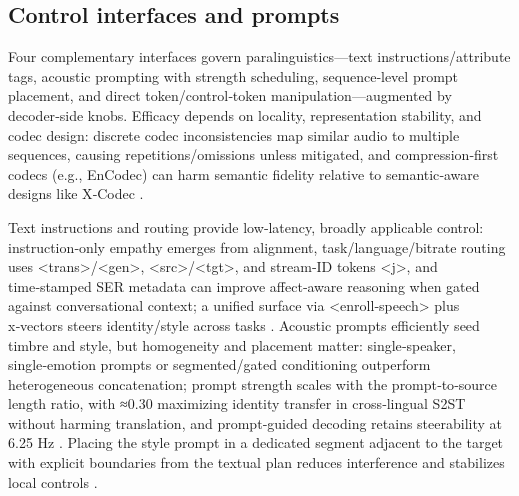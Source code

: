 \documentclass{article}
\begin{document}
\subsection{Control interfaces and prompts} \label{subsec:Control interfaces and prompts}
Four complementary interfaces govern paralinguistics—text instructions/attribute tags, acoustic prompting with strength scheduling, sequence‑level prompt placement, and direct token/control‑token manipulation—augmented by decoder‑side knobs. Efficacy depends on locality, representation stability, and codec design: discrete codec inconsistencies map similar audio to multiple sequences, causing repetitions/omissions unless mitigated, and compression‑first codecs (e.g., EnCodec) can harm semantic fidelity relative to semantic‑aware designs like X‑Codec \cite{liu2024analyzingmitigatinginconsistencydiscrete,ye2024codecdoesmatterexploringsemanticshortcom,fily2024establishingdegreesclosenessbetweenaudio}.

Text instructions and routing provide low‑latency, broadly applicable control: instruction‑only empathy emerges from alignment, task/language/bitrate routing uses <trans>/<gen>, <src>/<tgt>, and stream‑ID tokens <j>, and time‑stamped SER metadata can improve affect‑aware reasoning when gated against conversational context; a unified surface via <enroll‑speech> plus x‑vectors steers identity/style across tasks \cite{wang2024blspemotowardsempatheticlargespeechlangu,peng2024mslms2stmultitaskspeechlanguagemodeltext,wang2025incorporatingcontextualparalinguisticund,wu2024speechcomposerunifyingmultiplespeechtask}. Acoustic prompts efficiently seed timbre and style, but homogeneity and placement matter: single‑speaker, single‑emotion prompts or segmented/gated conditioning outperform heterogeneous concatenation; prompt strength scales with the prompt‑to‑source length ratio, with ≈0.30 maximizing identity transfer in cross‑lingual S2ST without harming translation, and prompt‑guided decoding retains steerability at 6.25 Hz \cite{peng2024empiricalstudyspeechlanguagemodelsprompt,gong2024seamlessexpressivelmspeechlanguagemodele,wang2025tadicodectextawarediffusionspeechtokeniz}. Placing the style prompt in a dedicated segment adjacent to the target with explicit boundaries from the textual plan reduces interference and stabilizes local controls \cite{wu2024speechcomposerunifyingmultiplespeechtask}.
\end{document}
